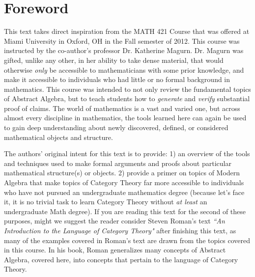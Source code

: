 \section{Foreword}
This text takes direct inspiration from the MATH 421 Course that was offered at Miami University in Oxford, OH in the Fall semester of 2012. This course was instructed by the co-author's professor Dr. Katherine Magurn. Dr. Magurn was gifted, unlike any other, in her ability to take dense material, that would otherwise \textit{only} be accessible to mathematicians with some prior knowledge, and make it accessible to individuals who had little or no formal background in mathematics. This course was intended to not only review the fundamental topics of Abstract Algebra, but to teach students how to \textit{generate} and \textit{verify} substantial proof of claims. The world of mathematics is a vast and varied one, but across almost every discipline in mathematics, the tools learned here can again be used to gain deep understanding about newly discovered, defined, or considered mathematical objects and structure. 

The authors' original intent for this text is to  provide: 1) an overview of the tools and techniques used to make formal arguments and proofs about particular mathematical structure(s) or objects. 2) provide a primer on topics of Modern Algebra that make topics of Category Theory far more accessible to individuals who have not pursued an undergraduate mathematics degree (because let's face it, it is no trivial task to learn Category Theory without \textit{at least} an undergraduate Math degree). If you are reading this text for the second of these purposes, might we suggest the reader consider Steven Roman's text \textit{``An Introduction to the Language of Category Theory"} after finishing this text, as many of the examples covered in Roman's text are drawn from the topics covered in this course. In his book, Roman generalizes many  concepts of Abstract Algebra, covered here, into concepts that pertain to the language of Category Theory.

